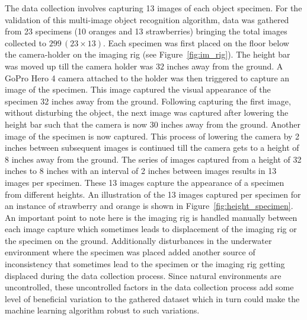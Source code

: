 \documentclass {udthesis}
\begin{document}
The data collection involves capturing 13 images of each object specimen. For the validation of this multi-image object recognition algorithm, data was gathered from 23 specimens (10 oranges and 13 strawberries) bringing the total images collected to $299\, (23 \times 13)$. Each specimen was first placed on the floor below the camera-holder on the imaging rig (see Figure~\ref{fig:im_rig}). The height bar was moved up till the camera holder was $32$ inches away from the ground. A GoPro Hero 4 camera attached to the holder was then triggered to capture an image of the specimen. This image captured the visual appearance of the specimen 32 inches away from the ground. Following capturing the first image, without disturbing the object, the next image was captured after lowering the height bar such that the camera is now $30$ inches away from the ground. Another image of the specimen is now captured. 
This process of lowering the camera by 2 inches between subsequent images is continued till the camera gets to a height of $8$ inches away from the ground. 
The series of images captured from a height of 32 inches to 8 inches with an interval of 2 inches between images results in 13 images per specimen. 
These 13 images capture the appearance of a specimen from different heights. An illustration of the 13 images captured per specimen for an instance of strawberry and orange is shown in Figure~\ref{fig:height_specimen}. An important point to note here is the imaging rig is handled manually between each image capture which sometimes leads to displacement of the imaging rig or the specimen on the ground. 
Additionally disturbances in the underwater environment where the specimen was placed added another source of inconsistency that sometimes lead to the specimen or the imaging rig getting displaced during the data collection process. 
Since natural environments are uncontrolled, these uncontrolled factors in the data collection process add some level of beneficial variation to the gathered dataset which in turn could make the machine learning algorithm robust to such variations.
\end{document}
